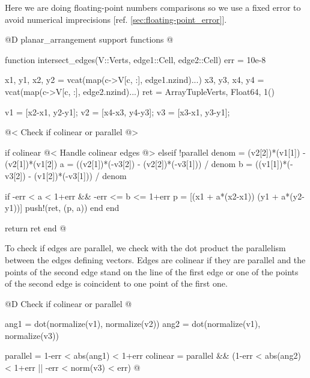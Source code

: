 Here we are doing floating-point numbers comparisons so we use a fixed
error to avoid numerical imprecisions [ref. \ref{sec:floating-point_error}].

@D planar\_arrangement support functions
@{function intersect_edges(V::Verts, edge1::Cell, edge2::Cell)
    err = 10e-8

    x1, y1, x2, y2 = vcat(map(c->V[c, :], edge1.nzind)...)
    x3, y3, x4, y4 = vcat(map(c->V[c, :], edge2.nzind)...)
    ret = Array{Tuple{Verts, Float64}, 1}()

    v1 = [x2-x1, y2-y1];
    v2 = [x4-x3, y4-y3];
    v3 = [x3-x1, y3-y1];

    @< Check if colinear or parallel @>

    if colinear
        @< Handle colinear edges @>
    elseif !parallel
        denom = (v2[2])*(v1[1]) - (v2[1])*(v1[2])
        a = ((v2[1])*(-v3[2]) - (v2[2])*(-v3[1])) / denom
        b = ((v1[1])*(-v3[2]) - (v1[2])*(-v3[1])) / denom

        if -err < a < 1+err && -err <= b <= 1+err
            p = [(x1 + a*(x2-x1))  (y1 + a*(y2-y1))]
            push!(ret, (p, a)) 
        end
    end

    return ret
end
@}

To check if edges are parallel, we check with the dot product 
the parallelism between the edges defining vectors.
Edges are colinear if they are parallel and the points of
the second edge stand on the line of the first edge
or one of the points of the second edge is coincident to
one point of the first one.

@D Check if colinear or parallel
@{ang1 = dot(normalize(v1), normalize(v2))
ang2 = dot(normalize(v1), normalize(v3))

parallel = 1-err < abs(ang1) < 1+err
colinear = parallel && (1-err < abs(ang2) < 1+err || -err < norm(v3) < err)
@}

